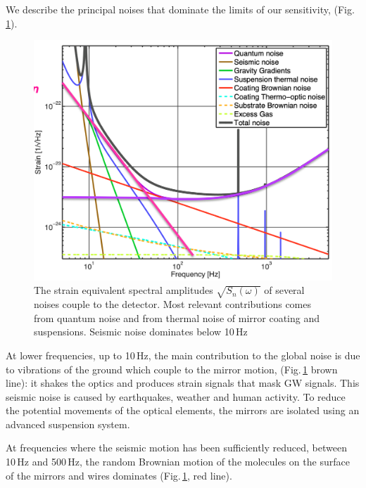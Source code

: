 \documentclass[binding=0.6cm, LaM]{sapthesis}
\begin{document}
        We describe the principal noises that dominate the limits of our sensitivity, (Fig.\,\ref{fig:noise2}).
        \begin{figure}[t]
          \includegraphics[scale=0.3]{noise2}
          \centering
          \caption{The strain equivalent spectral amplitudes $\sqrt{S_n(\omega)}$ of several noises couple to the detector. Most relevant contributions comes from quantum noise and from thermal noise of mirror coating and suspensions. Seismic noise dominates below 10\,Hz}
          \label{fig:noise2}
        \end{figure}
        At lower frequencies, up to 10\,Hz, the main contribution to the global noise
        is due to vibrations of the ground which couple to the mirror motion, (Fig.\,\ref{fig:noise2} brown line): 
	it shakes the optics and produces strain signals that mask GW signals. 
        This seismic noise is caused by earthquakes, weather and human activity.
        To reduce the potential movements of the optical elements,
        the mirrors are isolated using an advanced suspension system.

        At frequencies where the seismic motion has been sufficiently reduced,
        between 10\,Hz and 500\,Hz, the random Brownian motion of the molecules on the surface of the mirrors and wires dominates (Fig.\,\ref{fig:noise2}, red line).
\end{document}
